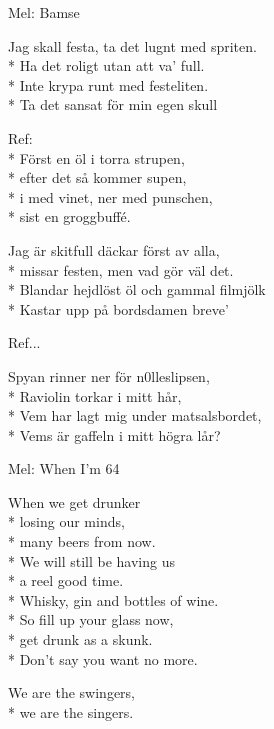 \begin{SongText}
    \begin{SongInfo}
        Mel: Bamse
    \end{SongInfo}
    \begin{SongVerse}
        Jag skall festa, ta det lugnt med spriten.\\*%
        Ha det roligt utan att va’ full.\\*%
        Inte krypa runt med festeliten.\\*%
        Ta det sansat för min egen skull
    \end{SongVerse}
    \begin{SongVerse}
        Ref:\\*%
        Först en öl i torra strupen,\\*%
        efter det så kommer supen,\\*%
        i med vinet, ner med punschen,\\*%
        sist en groggbuffé.
    \end{SongVerse}
    \begin{SongVerse}
        Jag är skitfull däckar först av alla,\\*%
        missar festen, men vad gör väl det.\\*%
        Blandar hejdlöst öl och gammal filmjölk\\*%
        Kastar upp på bordsdamen breve’
    \end{SongVerse}
    \begin{SongVerse}
        Ref...
    \end{SongVerse}
    \begin{SongVerse}
        Spyan rinner ner för n0lleslipsen,\\*%
        Raviolin torkar i mitt hår,\\*%
        Vem har lagt mig under matsalsbordet,\\*%
        Vems är gaffeln i mitt högra lår?
    \end{SongVerse}
\end{SongText}
\begin{SongText}
    \begin{SongInfo}
        Mel: When I'm 64
    \end{SongInfo}
    \begin{SongVerse}
        When we get drunker\\*%
        losing our minds,\\*%
        many beers from now.\\*%
        We will still be having us\\*%
        a reel good time.\\*%
        Whisky, gin and bottles of wine.\\*%
        So fill up your glass now,\\*%
        get drunk as a skunk.\\*%
        Don’t say you want no more.
    \end{SongVerse}
    \begin{SongVerse}
        We are the swingers,\\*%
        we are the singers.
    \end{SongVerse}
\end{SongText}
